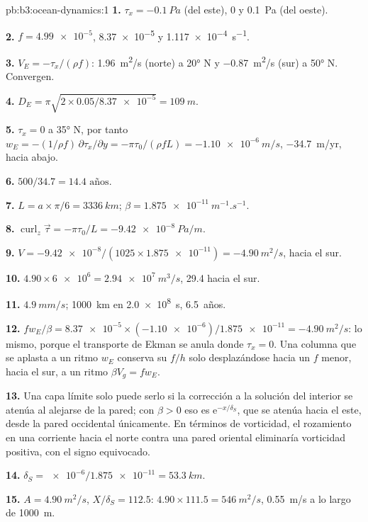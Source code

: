 \begin{solution}{pb:b3:ocean-dynamics:1}
\textbf{1.} $\tau_x = \qty{-0.1}{Pa}$ (del este), 0 y \qty{+0.1}{Pa}
(del oeste).

\textbf{2.} $f = \num{4.99e-5}$, \num{8.37e-5} y
\qty{1.117e-4}{s^{-1}}.

\textbf{3.} $V_E = -\tau_x/(\rho f)$: \qty{+1.96}{m^2/s} (norte) a
\ang{20} N y \qty{-0.87}{m^2/s} (sur) a \ang{50} N. Convergen.

\textbf{4.} $D_E = \pi\sqrt{2\times0.05/\num{8.37e-5}} = \qty{109}{m}$.

\textbf{5.} $\tau_x = 0$ a \ang{35} N, por tanto $w_E = -(1/\rho f)\,
\partial\tau_x/\partial y = -\pi\tau_0/(\rho fL) = \qty{-1.10e-6}{m/s}$,
\qty{-34.7}{m/yr}, hacia abajo.

\textbf{6.} $500/34.7 = \num{14.4}\text{ años}$.

\textbf{7.} $L = a\times\pi/6 = \qty{3336}{km}$; $\beta =
\qty{1.875e-11}{m^{-1}.s^{-1}}$.

\textbf{8.} $\operatorname{curl}_z\vec\tau = -\pi\tau_0/L =
\qty{-9.42e-8}{Pa/m}$.

\textbf{9.} $V = \num{-9.42e-8}/(1025\times\num{1.875e-11}) =
\qty{-4.90}{m^2/s}$, hacia el sur.

\textbf{10.} $4.90\times\num{6e6} = \qty{2.94e7}{m^3/s}$,
\qty{29.4}{\sverdrup} hacia el sur.

\textbf{11.} $\qty{4.9}{mm/s}$; \qty{1000}{km} en \qty{2.0e8}{s},
\num{6.5}~años.

\textbf{12.} $fw_E/\beta = \num{8.37e-5}\times(\num{-1.10e-6})/
\num{1.875e-11} = \qty{-4.90}{m^2/s}$: lo mismo, porque el transporte
de Ekman se anula donde $\tau_x = 0$. Una columna que se aplasta a un ritmo $w_E$
conserva su  $f/h$ solo desplazándose hacia un $f$ menor, hacia el sur,
a un ritmo $\beta V_g = fw_E$.

\textbf{13.} Una capa límite solo puede serlo si la corrección a la solución
del interior se atenúa al alejarse de la pared; con $\beta > 0$ eso es
$\mathrm e^{-x/\delta_S}$, que se atenúa hacia el este, desde la pared
occidental únicamente. En términos de vorticidad, el rozamiento en una corriente hacia el norte contra
una pared oriental eliminaría vorticidad positiva, con el signo equivocado.

\textbf{14.} $\delta_S = \num{e-6}/\num{1.875e-11} = \qty{53.3}{km}$.

\textbf{15.} $A = \qty{4.90}{m^2/s}$, $X/\delta_S = 112.5$:
$4.90\times111.5 = \qty{546}{m^2/s}$, \qty{0.55}{m/s} a lo largo de
\qty{1000}{m}.


\end{solution}
